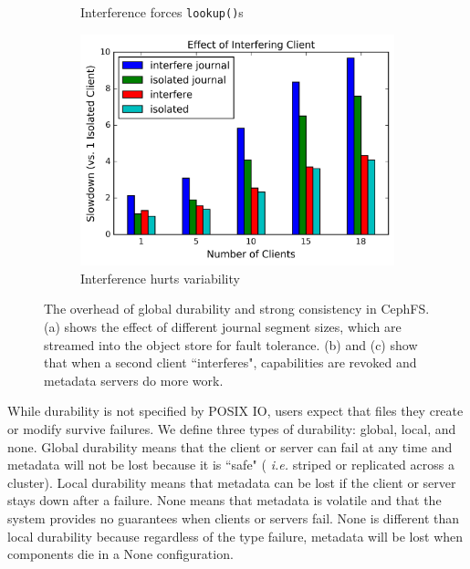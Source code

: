 \begin{figure}[t]
\begin{subfigure}[b]{.3\linewidth}
      \caption{Interference forces \texttt{lookup()}s}
      \label{fig:overhead-b}
  \end{subfigure}
  \begin{subfigure}[b]{.3\linewidth}
      \centering
      \includegraphics[width=1.0\linewidth]{graphs/slowdown-interfere-scale.png}
      \caption{Interference hurts variability}
      \label{fig:overhead-c}
  \end{subfigure}
  \caption{The overhead of global durability and strong consistency in CephFS.
  (a) shows the effect of different journal segment sizes, which are streamed
  into the object store for fault tolerance. (b) and (c) show that when a second
  client ``interferes", capabilities are revoked and metadata servers do more
  work.  \label{fig:overhead}}
\end{figure}

While durability is not specified by POSIX IO, users expect that files they
create or modify survive failures.  We define three types of durability:
global, local, and none.  Global durability means that the client or server can
fail at any time and metadata will not be lost because it is ``safe" ({\it
i.e.} striped or replicated across a cluster). Local durability means that
metadata can be lost if the client or server stays down after a failure. None
means that metadata is volatile and that the system provides no guarantees when
clients or servers fail.  None is different than local durability because
regardless of the type failure, metadata will be lost when components die in a
None configuration.

